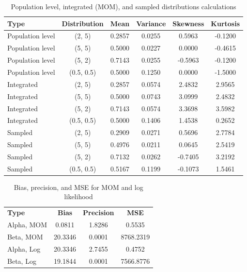 \documentclass{article}\usepackage[]{graphicx}\usepackage[]{xcolor}
\begin{document}
\begin{table}[h]
    \centering
    \begin{tabular}{|l|c|c|c|c|c|}
        \hline
        \textbf{Type} & \textbf{Distribution} & \textbf{Mean} & \textbf{Variance} & \textbf{Skewness} & \textbf{Kurtosis} \\
        \hline
        Population level & (2, 5)   & 0.2857  & 0.0255  & 0.5963  & -0.1200 \\
        Population level & (5, 5)   & 0.5000  & 0.0227  & 0.0000  & -0.4615 \\
        Population level & (5, 2)   & 0.7143  & 0.0255  & -0.5963 & -0.1200 \\
        Population level & (0.5, 0.5) & 0.5000  & 0.1250  & 0.0000  & -1.5000 \\
        \hline
        Integrated       & (2, 5)   & 0.2857  & 0.0574  & 2.4832  & 2.9565 \\
        Integrated       & (5, 5)   & 0.5000  & 0.0743  & 3.0999  & 2.4832 \\
        Integrated       & (5, 2)   & 0.7143  & 0.0574  & 3.3698  & 3.5982 \\
        Integrated       & (0.5, 0.5) & 0.5000  & 0.1406  & 1.4538  & 0.2652 \\
        \hline
        Sampled         & (2, 5)   & 0.2909  & 0.0271  & 0.5696  & 2.7784 \\
        Sampled         & (5, 5)   & 0.4976  & 0.0211  & 0.0645  & 2.5419 \\
        Sampled         & (5, 2)   & 0.7132  & 0.0262  & -0.7405 & 3.2192 \\
        Sampled         & (0.5, 0.5) & 0.5167  & 0.1199  & -0.1073 & 1.5461 \\
        \hline
    \end{tabular}
    \caption{Population level, integrated (MOM), and sampled distributions calculations}
    \label{tab1}
\end{table}

\begin{table}[h]
    \centering
    \begin{tabular}{|l|c|c|c|}
        \hline
        \textbf{Type} & \textbf{Bias} & \textbf{Precision} & \textbf{MSE} \\
        Alpha, MOM  & 0.0811  & 1.8286    & 0.5535 \\
        Beta, MOM   & 20.3346 & 0.0001    & 8768.2319 \\
        Alpha, Log  & 20.3346 & 2.7455    & 0.4752 \\
        Beta, Log   & 19.1844 & 0.0001    & 7566.8776 \\
        \hline
    \end{tabular}
    \caption{Bias, precision, and MSE for MOM and log likelihood}
    \label{tab2}
\end{table}
\end{document}
